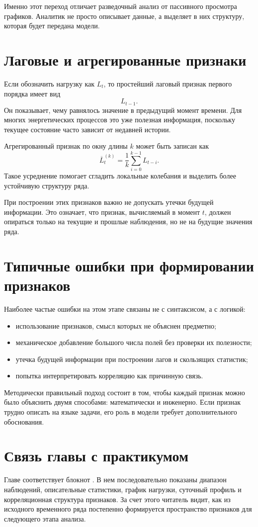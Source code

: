 Именно этот переход отличает разведочный анализ от пассивного просмотра графиков. Аналитик не просто описывает данные, а выделяет в них структуру, которая будет передана модели.

\section{Лаговые и агрегированные признаки}

Если обозначить нагрузку как $L_t$, то простейший лаговый признак первого порядка имеет вид
\[
L_{t-1}.
\]
Он показывает, чему равнялось значение в предыдущий момент времени. Для многих энергетических процессов это уже полезная информация, поскольку текущее состояние часто зависит от недавней истории.

Агрегированный признак по окну длины $k$ может быть записан как
\[
\overline{L}_t^{(k)} = \frac{1}{k}\sum_{i=0}^{k-1} L_{t-i}.
\]
Такое усреднение помогает сгладить локальные колебания и выделить более устойчивую структуру ряда.

При построении этих признаков важно не допускать утечки будущей информации. Это означает, что признак, вычисляемый в момент $t$, должен опираться только на текущие и прошлые наблюдения, но не на будущие значения ряда.

\section{Типичные ошибки при формировании признаков}

Наиболее частые ошибки на этом этапе связаны не с синтаксисом, а с логикой:
\begin{itemize}[leftmargin=1.25cm]
\item использование признаков, смысл которых не объяснен предметно;
\item механическое добавление большого числа полей без проверки их полезности;
\item утечка будущей информации при построении лагов и скользящих статистик;
\item попытка интерпретировать корреляцию как причинную связь.
\end{itemize}

Методически правильный подход состоит в том, чтобы каждый признак можно было объяснить двумя способами: математически и инженерно. Если признак трудно описать на языке задачи, его роль в модели требует дополнительного обоснования.

\section{Связь главы с практикумом}

Главе соответствует блокнот . В нем последовательно показаны диапазон наблюдений, описательные статистики, график нагрузки, суточный профиль и корреляционная структура признаков. За счет этого читатель видит, как из исходного временного ряда постепенно формируется пространство признаков для следующего этапа анализа.
